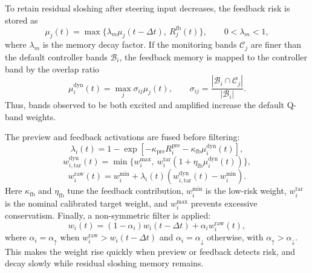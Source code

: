 To retain residual sloshing after steering input decreases, the feedback risk is stored as
\begin{equation}
    \mu_j(t)=\max\{\lambda_m\mu_j(t-\Delta t),~R_j^{\mathrm{fb}}(t)\},\qquad 0<\lambda_m<1 ,
\end{equation}
where $\lambda_m$ is the memory decay factor. If the monitoring bands $\mathcal{C}_j$ are finer than the default controller bands $\mathcal{B}_i$, the feedback memory is mapped to the controller band by the overlap ratio
\begin{equation}
    \mu_i^{\mathrm{dyn}}(t)=\max_j \sigma_{ij}\mu_j(t),\qquad
    \sigma_{ij}=\frac{|\mathcal{B}_i\cap\mathcal{C}_j|}{|\mathcal{B}_i|}.
\end{equation}
Thus, bands observed to be both excited and amplified increase the default Q-band weights.

The preview and feedback activations are fused before filtering:
\begin{equation}
    \lambda_i(t)=1-\exp[-\kappa_{\mathrm{pre}}R_i^{\mathrm{pre}}-\kappa_{\mathrm{fb}}\mu_i^{\mathrm{dyn}}(t)],
\end{equation}
\begin{equation}
    w_{i,\mathrm{tar}}^{\mathrm{dyn}}(t)=
    \min\{w_i^{\max},~w_i^{\mathrm{tar}}(1+\eta_{\mathrm{fb}}\mu_i^{\mathrm{dyn}}(t))\},
\end{equation}
\begin{equation}
    w_i^{\mathrm{raw}}(t)=w_i^{\min}
    +\lambda_i(t)\left(w_{i,\mathrm{tar}}^{\mathrm{dyn}}(t)-w_i^{\min}\right).
    \label{eq:raw_weight_combined}
\end{equation}
Here $\kappa_{\mathrm{fb}}$ and $\eta_{\mathrm{fb}}$ tune the feedback contribution, $w_i^{\min}$ is the low-risk weight, $w_i^{\mathrm{tar}}$ is the nominal calibrated target weight, and $w_i^{\max}$ prevents excessive conservatism. Finally, a non-symmetric filter is applied:
\begin{equation}
    w_i(t)=(1-\alpha_i)w_i(t-\Delta t)+\alpha_i w_i^{\mathrm{raw}}(t),
\end{equation}
where $\alpha_i=\alpha_\uparrow$ when $w_i^{\mathrm{raw}}>w_i(t-\Delta t)$ and $\alpha_i=\alpha_\downarrow$ otherwise, with $\alpha_\uparrow>\alpha_\downarrow$. This makes the weight rise quickly when preview or feedback detects risk, and decay slowly while residual sloshing memory remains.

